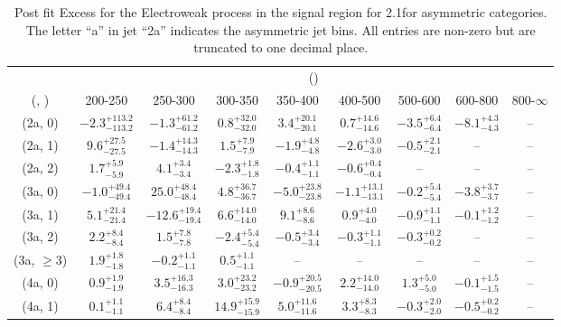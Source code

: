 \begin{table}[h!]
\tiny
\centering
\caption{Post fit Excess for the Electroweak process in the signal region for 2.1\ifb for asymmetric categories. The letter ``a'' in jet \eg ``2a''  indicates the asymmetric jet bins. All entries are non-zero but are truncated to one decimal place.\label{tab:excessseppost_sig_ewk_asym}}
\begin{tabular}
{ccccccccc}
	\hline\hline
	& \multicolumn{8}{c}{\scalht (\gev)} \\ 
	 (\njet,  \nb) & 200-250 & 250-300 & 300-350 & 350-400 & 400-500 & 500-600 & 600-800 & 800-$\infty$ \\ [0.8ex] 
\hline
	(2a, 0) & $-2.3^{+ 113.2 }_{- 113.2 }$ & $-1.3^{+ 61.2 }_{- 61.2 }$ & $0.8^{+ 32.0 }_{- 32.0 }$ & $3.4^{+ 20.1 }_{- 20.1 }$ & $0.7^{+ 14.6 }_{- 14.6 }$ & $-3.5^{+ 6.4 }_{- 6.4 }$ & $-8.1^{+ 4.3 }_{- 4.3 }$ & -- \\[0.5ex] 
	(2a, 1) & $9.6^{+ 27.5 }_{- 27.5 }$ & $-1.4^{+ 14.3 }_{- 14.3 }$ & $1.5^{+ 7.9 }_{- 7.9 }$ & $-1.9^{+ 4.8 }_{- 4.8 }$ & $-2.6^{+ 3.0 }_{- 3.0 }$ & $-0.5^{+ 2.1 }_{- 2.1 }$ & -- & -- \\[0.5ex] 
	(2a, 2) & $1.7^{+ 5.9 }_{- 5.9 }$ & $4.1^{+ 3.4 }_{- 3.4 }$ & $-2.3^{+ 1.8 }_{- 1.8 }$ & $-0.4^{+ 1.1 }_{- 1.1 }$ & $-0.6^{+ 0.4 }_{- 0.4 }$ & -- & -- & -- \\[0.5ex] 
	(3a, 0) & $-1.0^{+ 49.4 }_{- 49.4 }$ & $25.0^{+ 48.4 }_{- 48.4 }$ & $4.8^{+ 36.7 }_{- 36.7 }$ & $-5.0^{+ 23.8 }_{- 23.8 }$ & $-1.1^{+ 13.1 }_{- 13.1 }$ & $-0.2^{+ 5.4 }_{- 5.4 }$ & $-3.8^{+ 3.7 }_{- 3.7 }$ & -- \\[0.5ex] 
	(3a, 1) & $5.1^{+ 21.4 }_{- 21.4 }$ & $-12.6^{+ 19.4 }_{- 19.4 }$ & $6.6^{+ 14.0 }_{- 14.0 }$ & $9.1^{+ 8.6 }_{- 8.6 }$ & $0.9^{+ 4.0 }_{- 4.0 }$ & $-0.9^{+ 1.1 }_{- 1.1 }$ & $-0.1^{+ 1.2 }_{- 1.2 }$ & -- \\[0.5ex] 
	(3a, 2) & $2.2^{+ 8.4 }_{- 8.4 }$ & $1.5^{+ 7.8 }_{- 7.8 }$ & $-2.4^{+ 5.4 }_{- 5.4 }$ & $-0.5^{+ 3.4 }_{- 3.4 }$ & $-0.3^{+ 1.1 }_{- 1.1 }$ & $-0.3^{+ 0.2 }_{- 0.2 }$ & -- & -- \\[0.5ex] 
	(3a, $\ge3$) & $1.9^{+ 1.8 }_{- 1.8 }$ & $-0.2^{+ 1.1 }_{- 1.1 }$ & $0.5^{+ 1.1 }_{- 1.1 }$ & -- & -- & -- & -- & -- \\[0.5ex] 
	(4a, 0) & $0.9^{+ 1.9 }_{- 1.9 }$ & $3.5^{+ 16.3 }_{- 16.3 }$ & $3.0^{+ 23.2 }_{- 23.2 }$ & $-0.9^{+ 20.5 }_{- 20.5 }$ & $2.2^{+ 14.0 }_{- 14.0 }$ & $1.3^{+ 5.0 }_{- 5.0 }$ & $-0.1^{+ 1.5 }_{- 1.5 }$ & -- \\[0.5ex] 
	(4a, 1) & $0.1^{+ 1.1 }_{- 1.1 }$ & $6.4^{+ 8.4 }_{- 8.4 }$ & $14.9^{+ 15.9 }_{- 15.9 }$ & $5.0^{+ 11.6 }_{- 11.6 }$ & $3.3^{+ 8.3 }_{- 8.3 }$ & $-0.3^{+ 2.0 }_{- 2.0 }$ & $-0.5^{+ 0.2 }_{- 0.2 }$ & -- \\[0.5ex] 

\end{tabular}
\end{table}
